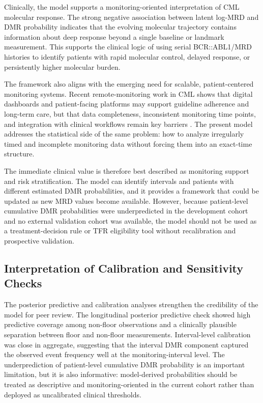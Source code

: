 \documentclass[11pt]{article}
\begin{document}
Clinically, the model supports a monitoring-oriented interpretation of CML molecular response. The strong negative association between latent log-MRD and DMR probability indicates that the evolving molecular trajectory contains information about deep response beyond a single baseline or landmark measurement. This supports the clinical logic of using serial BCR::ABL1/MRD histories to identify patients with rapid molecular control, delayed response, or persistently higher molecular burden.

The framework also aligns with the emerging need for scalable, patient-centered monitoring systems. Recent remote-monitoring work in CML shows that digital dashboards and patient-facing platforms may support guideline adherence and long-term care, but that data completeness, inconsistent monitoring time points, and integration with clinical workflows remain key barriers \cite{Verweij2026RemoteMonitoring}. The present model addresses the statistical side of the same problem: how to analyze irregularly timed and incomplete monitoring data without forcing them into an exact-time structure.

The immediate clinical value is therefore best described as monitoring support and risk stratification. The model can identify intervals and patients with different estimated DMR probabilities, and it provides a framework that could be updated as new MRD values become available. However, because patient-level cumulative DMR probabilities were underpredicted in the development cohort and no external validation cohort was available, the model should not be used as a treatment-decision rule or TFR eligibility tool without recalibration and prospective validation.

\subsection{Interpretation of Calibration and Sensitivity Checks}

The posterior predictive and calibration analyses strengthen the credibility of the model for peer review. The longitudinal posterior predictive check showed high predictive coverage among non-floor observations and a clinically plausible separation between floor and non-floor measurements. Interval-level calibration was close in aggregate, suggesting that the interval DMR component captured the observed event frequency well at the monitoring-interval level. The underprediction of patient-level cumulative DMR probability is an important limitation, but it is also informative: model-derived probabilities should be treated as descriptive and monitoring-oriented in the current cohort rather than deployed as uncalibrated clinical thresholds.
\end{document}
